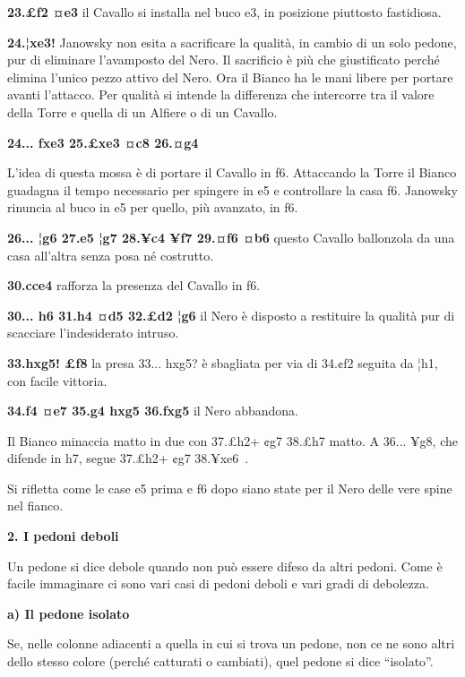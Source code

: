 \textbf{23.£f2 ¤e3} il Cavallo si installa nel buco e3, in posizione
piuttosto fastidiosa.

\textbf{24.¦xe3!} Janowsky non esita a sacrificare la qualità, in cambio
di un solo pedone, pur di eliminare l'avamposto del Nero. Il sacrificio
è più che giustificato perché elimina l'unico pezzo attivo del Nero. Ora
il Bianco ha le mani libere per portare avanti l'attacco. Per qualità si
intende la differenza che intercorre tra il valore della Torre e quella
di un Alfiere o di un Cavallo.

\textbf{24... fxe3 25.£xe3 ¤c8 26.¤g4}


L'idea di questa mossa è di portare il Cavallo in f6. Attaccando la
Torre il Bianco guadagna il tempo necessario per spingere in e5 e
controllare la casa f6. Janowsky rinuncia al buco in e5 per quello, più
avanzato, in f6.

\textbf{26... ¦g6 27.e5 ¦g7 28.¥c4 ¥f7 29.¤f6 ¤b6} questo Cavallo
ballonzola da una casa all'altra senza posa né costrutto.

\textbf{30.cce4} rafforza la presenza del Cavallo in f6.

\textbf{30... h6 31.h4 ¤d5 32.£d2 ¦g6} il Nero è disposto a restituire
la qualità pur di scacciare l'indesiderato intruso.

\textbf{33.hxg5! £f8} la presa 33... hxg5? è sbagliata per via di 34.¢f2
seguita da ¦h1, con facile vittoria.

\textbf{34.f4 ¤e7 35.g4 hxg5 36.fxg5} il Nero abbandona.

Il Bianco minaccia matto in due con 37.£h2+ ¢g7 38.£h7 matto. A 36...
¥g8, che difende in h7, segue 37.£h2+ ¢g7 38.¥xe6~.

Si rifletta come le case e5 prima e f6 dopo siano state per il Nero
delle vere spine nel fianco.

\textbf{2. I pedoni deboli}

Un pedone si dice debole quando non può essere difeso da altri pedoni.
Come è facile immaginare ci sono vari casi di pedoni deboli e vari gradi
di debolezza.

\textbf{a) Il pedone isolato}

Se, nelle colonne adiacenti a quella in cui si trova un pedone, non ce
ne sono altri dello stesso colore (perché catturati o cambiati), quel
pedone si dice ``isolato''.


